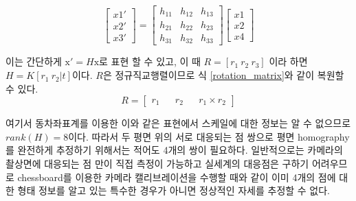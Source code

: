 \documentclass[master,korean,final]{cbnu-ecs}
\begin{document}
\begin{equation}
\begin{bmatrix} x1'\\x2'\\x3' \end{bmatrix} = \begin{bmatrix} h_{11} & h_{12} & h_{13} \\ h_{21} & h_{22} & h_{23} \\ h_{31} & h_{32} & h_{33} \end{bmatrix}\begin{bmatrix} x1\\x2\\x4 \end{bmatrix} \label{planar_homography}
\end{equation}

이는 간단하게 $\mathrm{x}'=H\mathrm{x}$로 표현 할 수 있고, 이 때 $R=[r_1 \ r_2 \ r_3]$ 이라 하면 $H=K[r_{1} \  r_{2}|t]$이다.
$R$은 정규직교행렬이므로 식 \eqref{rotation_matrix}와 같이 복원할 수 있다.
\begin{equation}
R=\begin{bmatrix}r_1 && r_2 && r_1\times r_2\end{bmatrix} 
\label{rotation_matrix}
\end{equation}

여기서 동차좌표계를 이용한 이와 같은 표현에서 스케일에 대한 정보는 알 수 없으므로 $rank(H)=8$이다. 따라서 두 평면 위의 서로 대응되는 점 쌍으로 평면 homography를 완전하게 추정하기 위해서는 적어도 4개의 쌍이 필요하다. 일반적으로는 카메라의 촬상면에 대응되는 점 만이 직접 측정이 가능하고 실세계의 대응점은 구하기 어려우므로 chessboard를 이용한 카메라 캘리브레이션을 수행할 때와 같이 이미 4개의 점에 대한 형태 정보를 알고 있는 특수한 경우가 아니면 정상적인 자세를 추정할 수 없다.
\end{document}
